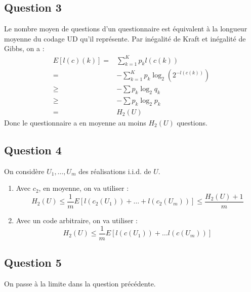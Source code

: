 \documentclass{cours}
\begin{document}
\subsection{Question 3}
Le nombre moyen de questions d'un questionnaire est équivalent à la longueur moyenne du codage UD qu'il représente. Par inégalité de Kraft et inégalité de Gibbs, on a : 
\[
    \begin{aligned}
        E[l(c)(k)] =& \sum_{k = 1}^{K}p_{k}l(c(k))\\
        =& -\sum_{k = 1}^{K}p_{k}\log_{2}(2^{-l(c(k))})\\
        \geq & -\sum p_{k}\log_{2}q_{k}\\
        \geq & -\sum p_{k}\log_{2}p_{k} \\
        = & H_{2}(U)
    \end{aligned}
\]
Donc le questionnaire a en moyenne au moins $H_{2}(U)$ questions. 

\subsection{Question 4}
On considère $U_{1},\ldots, U_{m}$ des réalisations i.i.d. de $U$. 
\begin{enumerate}
\item Avec $c_{2}$, en moyenne, on va utiliser : 
\[
    H_{2}(U) \leq \frac{1}{m}E[l(c_{2}(U_{1})) + \ldots + l(c_{2}(U_{m}))] \leq \frac{H_{2}(U) + 1}{m}
\]
\item Avec un code arbitraire, on va utiliser : 
\[
    H_{2}(U) \leq \frac{1}{m}E[l(c(U_{1})) + \ldots l(c(U_{m}))]
\]
\end{enumerate}


\subsection{Question 5}
On passe à la limite dans la question précédente. 
\end{document}
